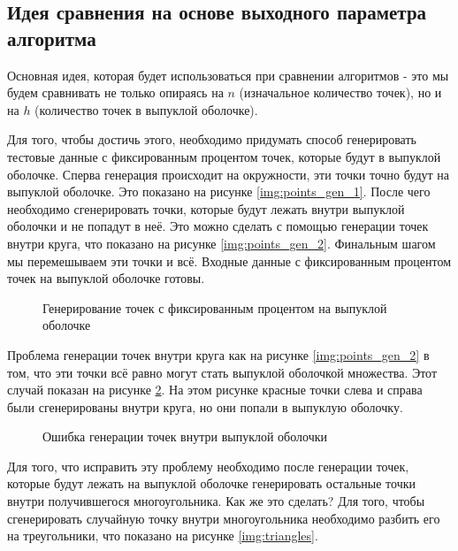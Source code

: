 \subsection{Идея сравнения на основе выходного параметра алгоритма}

Основная идея, которая будет использоваться при сравнении алгоритмов - это мы будем сравнивать не только опираясь на $n$ (изначальное количество точек), но и на $h$ (количество точек в выпуклой оболочке).

Для того, чтобы достичь этого, необходимо придумать способ генерировать тестовые данные с фиксированным процентом точек, которые будут в выпуклой оболочке. Сперва генерация происходит на окружности, эти точки точно будут на выпуклой оболочке. Это показано на рисунке \ref{img:points_gen_1}. После чего необходимо сгенерировать точки, которые будут лежать внутри выпуклой оболочки и не попадут в неё. Это можно сделать с помощью генерации точек внутри круга, что показано на рисунке \ref{img:points_gen_2}. Финальным шагом мы перемешываем эти точки и всё. Входные данные с фиксированным процентом точек на выпуклой оболочке готовы.

\begin{figure}
	{\centering
		\hfill
		\subbottom[\label{img:points_gen_1}]{%
			}
		\hfill
		\subbottom[\label{img:points_gen_2}]{%
			}
		\hfill
	}
	\caption{Генерирование точек с фиксированным процентом на выпуклой оболочке}
	\label{img:points_gen}
\end{figure}

Проблема генерации точек внутри круга как на рисунке \ref{img:points_gen_2} в том, что эти точки всё равно могут стать выпуклой оболочкой множества. Этот случай показан на рисунке \ref{img:gen_error}. На этом рисунке красные точки слева и справа были сгенерированы внутри круга, но они попали в выпуклую оболочку.

\begin{figure}[H]
	\centering
	
	\caption{Ошибка генерации точек внутри выпуклой оболочки}
	\label{img:gen_error}
\end{figure}

Для того, что исправить эту проблему необходимо после генерации точек, которые будут лежать на выпуклой оболочке генерировать остальные точки внутри получившегося многоугольника. Как же это сделать? Для того, чтобы сгенерировать случайную точку внутри многоугольника необходимо разбить его на треугольники, что показано на рисунке \ref{img:triangles}.


